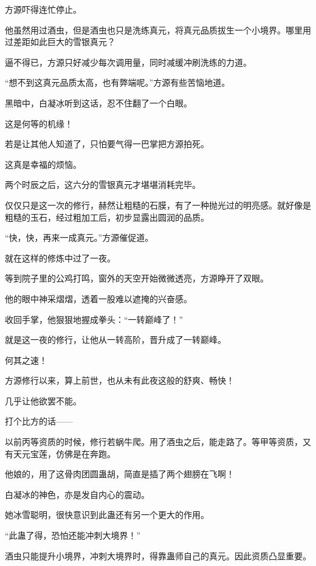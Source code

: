 
\begin{this_body}

方源吓得连忙停止。

他虽然用过酒虫，但是酒虫也只是洗练真元，将真元品质拔生一个小境界。哪里用过差距如此巨大的雪银真元？

逼不得已，方源只好减少每次调用量，同时减缓冲刷洗练的力道。

“想不到这真元品质太高，也有弊端呢。”方源有些苦恼地道。

黑暗中，白凝冰听到这话，忍不住翻了一个白眼。

这是何等的机缘！

若是让其他人知道了，只怕要气得一巴掌把方源拍死。

这真是幸福的烦恼。

两个时辰之后，这六分的雪银真元才堪堪消耗完毕。

仅仅只是这一次的修行，赫然让粗糙的石膜，有了一种抛光过的明亮感。就好像是粗糙的玉石，经过粗加工后，初步显露出圆润的品质。

“快，快，再来一成真元。”方源催促道。

就在这样的修炼中过了一夜。

等到院子里的公鸡打鸣，窗外的天空开始微微透亮，方源睁开了双眼。

他的眼中神采熠熠，透着一股难以遮掩的兴奋感。

收回手掌，他狠狠地握成拳头：“一转巅峰了！”

就是这一夜的修行，让他从一转高阶，晋升成了一转巅峰。

何其之速！

方源修行以来，算上前世，也从未有此夜这般的舒爽、畅快！

几乎让他欲罢不能。

打个比方的话——

以前丙等资质的时候，修行若蜗牛爬。用了酒虫之后，能走路了。等甲等资质，又有天元宝莲，仿佛是在奔跑。

他娘的，用了这骨肉团圆蛊胡，简直是插了两个翅膀在飞啊！

白凝冰的神色，亦是发自内心的震动。

她冰雪聪明，很快意识到此蛊还有另一个更大的作用。

“此蛊了得，恐怕还能冲刺大境界！”

酒虫只能提升小境界，冲刺大境界时，得靠蛊师自己的真元。因此资质凸显重要。


\end{this_body}
